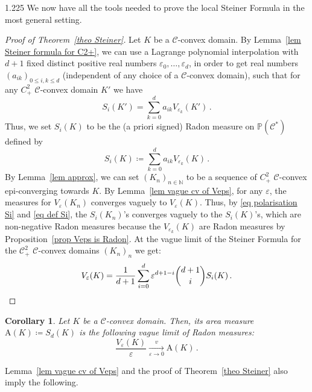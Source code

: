 \documentclass[reqno, a4paper]{amsart}
\numberwithin{equation}{section}
\numberwithin{figure}{section}
\newtheorem{corollary}[theorem]{Corollary}
\theoremstyle{definition}
\theoremstyle{remark}
\newcommand{\N}{\mathbb{N}} %
\renewcommand{\P}{\mathbb{P}} %
\newcommand{\C}{\mathcal{C}} %
\newcommand{\Area}{\mathrm{A}} %
\begin{document}
\begin{spacing}{1.225}
We now have all the tools needed to prove the local Steiner Formula in the most general setting. 

\begin{proof}[Proof of Theorem~\ref{theo Steiner}]
Let $K$ be a $\C$-convex domain. By Lemma~\ref{lem Steiner formula for C2+}, we can use a Lagrange polynomial interpolation with $d+1$ fixed distinct positive real numbers $\varepsilon_0,\dots, \varepsilon_{d}$, in order to get real numbers $(a_{ik})_{0\leq i,k\leq d}$ (independent of any choice of a $\C$-convex domain), such that for any $C^2_+$ $\C$-convex domain $K'$ we have 
\begin{equation}
\label{eq polarisation Si}
 S_i(K') = \sum_{k=0}^{d} a_{ik} V_{\varepsilon_k}(K') \, . 
\end{equation}
Thus, we set $S_i(K)$ to be the (a priori signed) Radon measure on $\P(\C^*)$ defined by 
\begin{equation}
\label{eq def Si}
 S_i(K) \coloneqq \sum_{k=0}^{d} a_{ik} V_{\varepsilon_k}(K) \, . 
\end{equation}
By Lemma~\ref{lem approx}, we can set $(K_n)_{n\in\N}$ to be a sequence of $C^2_+$ $\C$-convex epi-converging towards $K$. By Lemma~\ref{lem vague cv of Veps}, for any $\varepsilon$, the measures for $V_{\varepsilon}(K_n)$ converges vaguely to $V_{\varepsilon}(K)$. Thus, by \eqref{eq polarisation Si} and \eqref{eq def Si}, the $S_i(K_n)$'s converges vaguely to the $S_i(K)$'s, which are non-negative Radon measures because the $V_{\varepsilon_k}(K)$ are Radon measures by Proposition~\ref{prop Veps is Radon}. At the vague limit of the Steiner Formula for the $\C^2_+$ $\C$-convex domains $(K_n)_n$ we get: 
\begin{equation*}
V_\varepsilon(K) = \frac{1}{d+1}\sum_{i=0}^{d}\varepsilon^{d+1-i} \binom{d+1}{i} S_i(K) \, . \qedhere
\end{equation*}
\end{proof}

\begin{corollary}
\label{cor vague limit Veps/eps}
Let $K$ be a $\C$-convex domain. Then, its area measure $\Area(K) \coloneqq S_d(K)$ is the following vague limit of Radon measures:
\begin{equation*}
 \frac{V_\varepsilon(K)}{\varepsilon} \xrightarrow[\varepsilon \to 0]{v} \Area(K) \, . 
\end{equation*}
\end{corollary}

Lemma~\ref{lem vague cv of Veps} and the proof of Theorem~\ref{theo Steiner} also imply the following. 


\end{spacing}
\end{document}
